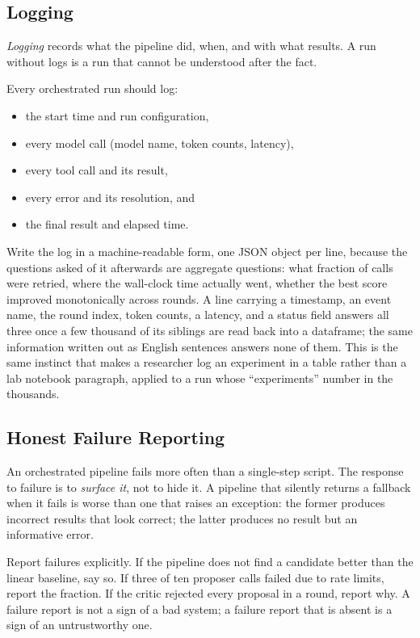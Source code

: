 \subsection{Logging}

\emph{Logging} records what the pipeline did, when, and with what results.
A run without logs is a run that cannot be understood after the fact.

Every orchestrated run should log:
\begin{itemize}
\item the start time and run configuration,
\item every model call (model name, token counts, latency),
\item every tool call and its result,
\item every error and its resolution, and
\item the final result and elapsed time.
\end{itemize}

Write the log in a machine-readable form, one JSON object per line, because the questions asked of it afterwards are aggregate questions: what fraction of calls were retried, where the wall-clock time actually went, whether the best score improved monotonically across rounds.
A line carrying a timestamp, an event name, the round index, token counts, a latency, and a status field answers all three once a few thousand of its siblings are read back into a dataframe; the same information written out as English sentences answers none of them.
This is the same instinct that makes a researcher log an experiment in a table rather than a lab notebook paragraph, applied to a run whose ``experiments'' number in the thousands.

\subsection{Honest Failure Reporting}

An orchestrated pipeline fails more often than a single-step script.
The response to failure is to \emph{surface it}, not to hide it.
A pipeline that silently returns a fallback when it fails is worse than one that raises an exception: the former produces incorrect results that look correct; the latter produces no result but an informative error.

\begin{principle}
\label{principle:HonestFailure}
Report failures explicitly.
If the pipeline does not find a candidate better than the linear baseline, say so.
If three of ten proposer calls failed due to rate limits, report the fraction.
If the critic rejected every proposal in a round, report why.
A failure report is not a sign of a bad system; a failure report that is absent is a sign of an untrustworthy one.
\end{principle}

